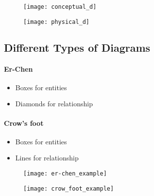 \begin{minipage}{0.48\textwidth}
\begin{figure}[H]
    \centering
    \texttt{[image: conceptual\_d]}
\end{figure}
\end{minipage}
\hfill
\begin{minipage}{0.48\textwidth}
\begin{figure}[H]
    \centering
    \texttt{[image: physical\_d]}
\end{figure}
\end{minipage}

\subsection{Different Types of Diagrams}

\begin{minipage}[t]{0.48\textwidth}
\paragraph*{Er-Chen}
\begin{itemize}
    \item Boxes for entities
    \item Diamonds for relationship
\end{itemize}
\end{minipage}
\hfill
\begin{minipage}[t]{0.48\textwidth}
\paragraph*{Crow's foot}
\begin{itemize}
    \item Boxes for entities
    \item Lines for relationship
\end{itemize}
\end{minipage}

\begin{minipage}{0.48\textwidth}
\begin{figure}[H]
    \centering
    \texttt{[image: er-chen\_example]}
\end{figure}
\end{minipage}
\hfill
\begin{minipage}{0.48\textwidth}
\begin{figure}[H]
    \centering
    \texttt{[image: crow\_foot\_example]}
\end{figure}
\end{minipage}

